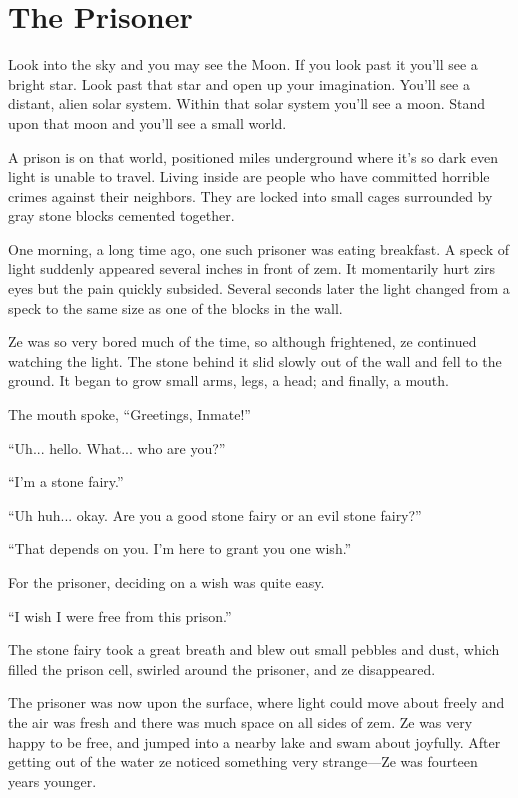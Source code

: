 \chapter{The Prisoner}

Look into the sky and you may see the Moon. If you look past it you'll see a bright star. Look past that star and open up your imagination. You'll see a distant, alien solar system. Within that solar system you'll see a moon. Stand upon that moon and you'll see a small world.

A prison is on that world, positioned miles underground where it's so dark even light is unable to travel. Living inside are people who have committed horrible crimes against their neighbors. They are locked into small cages surrounded by gray stone blocks cemented together.

One morning, a long time ago, one such prisoner was eating breakfast. A speck of light suddenly appeared several inches in front of zem. It momentarily hurt zirs eyes but the pain quickly subsided. Several seconds later the light changed from a speck to the same size as one of the blocks in the wall.

Ze was so very bored much of the time, so although frightened, ze continued watching the light. The stone behind it slid slowly out of the wall and fell to the ground. It began to grow small arms, legs, a head; and finally, a mouth.

The mouth spoke, “Greetings, Inmate!”

“Uh... hello. What... who are you?”

“I'm a stone fairy.”

“Uh huh... okay. Are you a good stone fairy or an evil stone fairy?”

“That depends on you. I'm here to grant you one wish.”

For the prisoner, deciding on a wish was quite easy.

“I wish I were free from this prison.”

The stone fairy took a great breath and blew out small pebbles and dust, which filled the prison cell, swirled around the prisoner, and ze disappeared.

The prisoner was now upon the surface, where light could move about freely and the air was fresh and there was much space on all sides of zem. Ze was very happy to be free, and jumped into a nearby lake and swam about joyfully. After getting out of the water ze noticed something very strange—Ze was fourteen years younger.

